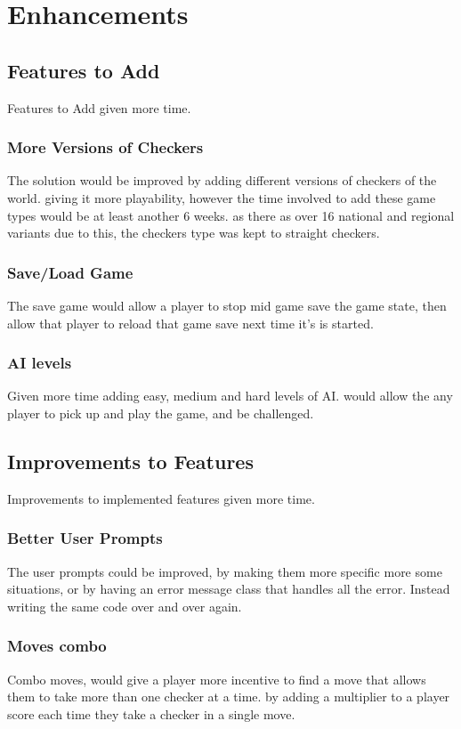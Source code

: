 \documentclass[10pt, a4paper]{article}
\begin{document}
	\section{Enhancements}	
	\subsection{Features to Add}
	Features to Add given more time.
	\subsubsection{More Versions of Checkers}
	The solution would be improved by adding different versions of checkers of the world. giving it more playability, however the time involved to add these game types would be at least another 6 weeks. as there as over 16 national and regional variants due to this, the checkers type was kept to straight checkers.
	\subsubsection{Save/Load Game}
	The save game would allow a player to stop mid game save the game state, then allow that player to reload that game save next time it's is started. 	
	\subsubsection{AI levels}
	Given more time adding easy, medium and hard levels of AI. would allow the any player to pick up and play the game, and be challenged.
	\subsection{Improvements to Features}
	Improvements to implemented features given more time.
	\subsubsection{Better User Prompts}
	The user prompts could be improved, by making them more specific more some situations, or by having an error message class that handles all the error. Instead writing the same code over and over again.
	\subsubsection{Moves combo}
	Combo moves, would give a player more incentive to find a move that allows them to take more than one checker at a time. by adding a multiplier to a player score each time they take a checker in a single move.
\end{document}
